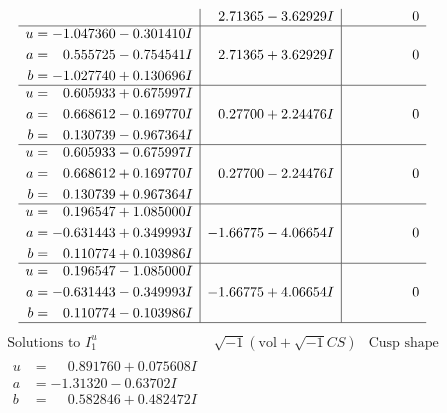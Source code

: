\documentclass[1p]{elsarticle_modified}
\theoremstyle{definition}
\newcommand{\I}{\sqrt{-1}}
\begin{document}
$$\begin{array}{c|c|c}
 & \phantom{-}2.71365 - 3.62929 I & \phantom{-0.000000 } 0 \\ \hline\begin{aligned}
u &= -1.047360 - 0.301410 I \\
a &= \phantom{-}0.555725 - 0.754541 I \\
b &= -1.027740 + 0.130696 I\end{aligned}
 & \phantom{-}2.71365 + 3.62929 I & \phantom{-0.000000 } 0 \\ \hline\begin{aligned}
u &= \phantom{-}0.605933 + 0.675997 I \\
a &= \phantom{-}0.668612 - 0.169770 I \\
b &= \phantom{-}0.130739 - 0.967364 I\end{aligned}
 & \phantom{-}0.27700 + 2.24476 I & \phantom{-0.000000 } 0 \\ \hline\begin{aligned}
u &= \phantom{-}0.605933 - 0.675997 I \\
a &= \phantom{-}0.668612 + 0.169770 I \\
b &= \phantom{-}0.130739 + 0.967364 I\end{aligned}
 & \phantom{-}0.27700 - 2.24476 I & \phantom{-0.000000 } 0 \\ \hline\begin{aligned}
u &= \phantom{-}0.196547 + 1.085000 I \\
a &= -0.631443 + 0.349993 I \\
b &= \phantom{-}0.110774 + 0.103986 I\end{aligned}
 & -1.66775 - 4.06654 I & \phantom{-0.000000 } 0 \\ \hline\begin{aligned}
u &= \phantom{-}0.196547 - 1.085000 I \\
a &= -0.631443 - 0.349993 I \\
b &= \phantom{-}0.110774 - 0.103986 I\end{aligned}
 & -1.66775 + 4.06654 I & \phantom{-0.000000 } 0\\
 \hline 
 \end{array}$$\newpage$$\begin{array}{c|c|c}  
\text{Solutions to }I^u_{1}& \I (\text{vol} + \sqrt{-1}CS) & \text{Cusp shape}\\
 \hline 
\begin{aligned}
u &= \phantom{-}0.891760 + 0.075608 I \\
a &= -1.31320 - 0.63702 I \\
b &= \phantom{-}0.582846 + 0.482472 I\end{aligned}

\end{array}$$
\end{document}
